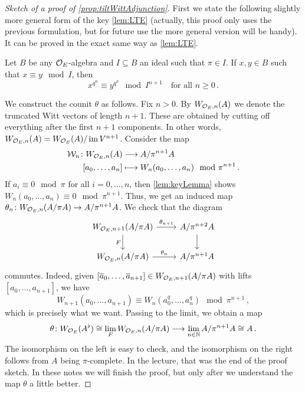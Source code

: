 \begin{proof}[Sketch of a proof of \cref{prop:tiltWittAdjunction}]
	First we state the following slightly more general form of the key \cref{lem:LTE} (actually, this proof only uses the previous formulation, but for future use the more general version will be handy). It can be proved in the exact same way as \cref{lem:LTE}.
	\begin{lem}\label{lem:keyLemma}
		Let $B$ be any $\mathcal{O}_E$-algebra and $I\subseteq B$ an ideal such that $\pi\in I$. If $x,y\in B$ such that $x\equiv y\mod I$, then
		\begin{equation*}
			x^{q^n}\equiv y^{q^n}\mod I^{n+1}\quad\text{for all }n\geq 0\,.
		\end{equation*}
	\end{lem}
	We construct the counit $\theta$ as follows. Fix $n>0$. By $W_{\mathcal{O}_E,n}(A)$ we denote the truncated Witt vectors of length $n+1$. These are obtained by cutting off everything after the first $n+1$ components. In other words, $W_{\mathcal{O}_E,n}(A)=W_{\mathcal{O}_E}(A)/\operatorname{im} V^{n+1}$. Consider the map
	\begin{align*}
		\Ww_n\colon W_{\Oo_E,n}(A)&\morphism A/\pi^{n+1}A\\
		[a_0,\dotsc,a_n]&\longmapsto W_n(a_0,\dotsc,a_n)\mod \pi^{n+1}\,.
	\end{align*}
	If $a_i\equiv 0\mod \pi$ for all $i=0,\dotsc,n$, then \cref{lem:keyLemma} shows $W_n(a_0,\dotsc,a_n)\equiv 0\mod \pi^ {n+1}$. Thus, we get an induced map $\theta_n\colon W_{\Oo_E,n}(A/\pi A)\morphism A/\pi^{n+1}A$. We check that the diagram
	\begin{equation*}
		\begin{tikzcd}
			W_{\Oo_E,n+1}(A/\pi A)\dar["F"{swap}]\rar["\theta_{n+1}"] & A/\pi^{n+2}A\dar\\
			W_{\Oo_E,n}(A/\pi A)\rar["\theta_n"] & A/\pi^{n+1}A
		\end{tikzcd}
	\end{equation*}
	commutes. Indeed, given $[\ov{a}_0,\dotsc,\ov{a}_{n+1}]\in W_{\Oo_E,n+1}(A/\pi A)$ with lifts $[a_0,\dotsc,a_{n+1}]$, we have
	\begin{equation*}
		W_{n+1}(a_0,\dotsc,a_{n+1})\equiv W_n(a_0^q,\dotsc,a_n^q)\mod \pi^{n+1}\,,
	\end{equation*}
	which is precisely what we want. Passing to the limit, we obtain a map
	\begin{equation*}
		\theta\colon W_{\Oo_E}(A^\flat)\cong \limit_FW_{\Oo_E,n}(A/\pi A)\morphism \limit_{n \in\IN}A/\pi^{n+1}A\cong A\,.
	\end{equation*}
	The isomorphism on the left is easy to check, and the isomorphism on the right follows from $A$ being $\pi$-complete. In the lecture, that was the end of the proof sketch. In these notes we will finish the proof, but only after we understand the map $\theta$ a little better.
\end{proof}
